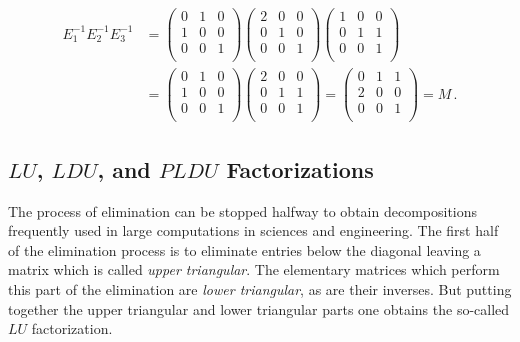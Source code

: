 \begin{example}
\begin{align*}
E_1^{-1}E_2^{-1}E_3^{-1}
&=
\left(\begin{array}{ccc}
0  &1 &0\\
1  &0 &0\\ 
0  &0 &1\\
\end{array}  \right)
 \left(\begin{array}{ccc}
2  &0 &0\\
0  &1 &0\\ 
0  &0 &1\\
\end{array}  \right) 
\left(\begin{array}{ccc}
1  &0 &0\\
0  &1 & 1\\ 
0  &0 &1\\
\end{array}  \right) 
\\[2mm] %
&=
\left(\begin{array}{ccc}
0  &1 &0\\
1  &0 &0\\ 
0  &0 &1\\
\end{array}  \right)
 \left(\begin{array}{ccc}
2  &0 &0\\
0  &1 &1\\ 
0  &0 &1\\
\end{array}  \right) 
= %
\left(\begin{array}{ccc}
 0 &1 &1\\
2  &0 &0\\ 
0  &0 &1\\
\end{array}  \right)  = M \, .
\end{align*}
\end{example}

\subsection{\texorpdfstring{$LU$, $LDU$, and $PLDU$}{LU, LDU, and PLDU} Factorizations}\label{LUtake1}
The process of elimination can be stopped halfway to obtain decompositions frequently used in large computations in sciences and engineering. 
The first half of the elimination process is to eliminate entries below the diagonal  
leaving a matrix which is called {\itshape upper triangular}. The elementary matrices which perform this part of the elimination are {\itshape lower triangular}, as are their inverses. But putting together the upper triangular and lower triangular parts one obtains the so-called $LU$ factorization.


